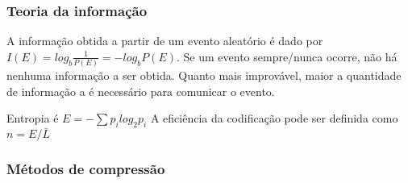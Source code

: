 \documentclass[twocolumn, 9pt]{article}
\begin{document}
\subsubsection*{Teoria da informação}
\label{sec:org17d8350}
A informação obtida a partir de um evento aleatório é dado por \(I(E) = log_b \frac{1}{P(E)} = -log_b P(E)\).
Se um evento sempre/nunca ocorre, não há nenhuma informação a ser obtida.
Quanto mais improvável, maior a quantidade de informação a é necessário para comunicar o evento.

Entropia é \(E = - \sum p_i log_2 p_i\)
A eficiência da codificação pode ser definida como \(n = E/\bar{L}\)

\subsubsection*{Métodos de compressão}
\label{sec:org91cc860}
\end{document}

